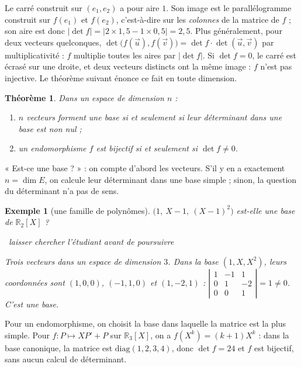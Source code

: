 \documentclass[a4paper,11pt]{article}
\numberwithin{equation}{section}
\numberwithin{figure}{section}
\numberwithin{table}{section}
\theoremstyle{enonce}
\newtheorem{theoreme}[definition]{Théorème}
\theoremstyle{exemple}
\newtheorem{exemple}[definition]{Exemple}
\theoremstyle{remarque}
\newcommand{\chercher}{\par\smallskip\noindent{\color{Filet}\rule[0.5ex]{1.2cm}{0.4pt}}\
  {\footnotesize\sffamily\itshape\color{Gris}laisser chercher l'étudiant avant de poursuivre}\par\smallskip}
\newcommand{\marge}[1]{\leavevmode\marginpar{\raggedleft\scriptsize\sffamily\color{Gris}\textls[100]{\MakeUppercase{#1}}}\ignorespaces}
\newcommand{\R}{\mathbb{R}}
\newcommand{\ve}[1]{\vec{#1}}
\newcommand{\dt}[1]{\left|\begin{matrix}#1\end{matrix}\right|}
\begin{document}
\begin{lecture}
Le carré construit sur $(e_1,e_2)$ a pour aire $1$. Son image est le parallélogramme construit sur $f(e_1)$ et $f(e_2)$,
c'est-à-dire sur les \emph{colonnes} de la matrice de $f$ ; son aire est donc $|\det f|=|2\times1{,}5-1\times0{,}5|=2{,}5$.
Plus généralement, pour deux vecteurs quelconques, $\det\big(f(\ve u),f(\ve v)\big)=\det f\cdot\det(\ve u,\ve v)$ par
multiplicativité : $f$ multiplie toutes les aires par $|\det f|$. Si $\det f=0$, le carré est écrasé sur une droite, et
deux vecteurs distincts ont la même image : $f$ n'est pas injective. Le théorème suivant énonce ce fait en toute dimension.
\end{lecture}

\begin{theoreme}\label{thm:base}
Dans un espace de dimension $n$ :
\begin{enumerate}
\item $n$ vecteurs forment une base si et seulement si leur déterminant dans une base est non nul ;
\item un endomorphisme $f$ est bijectif si et seulement si $\det f\neq0$.
\end{enumerate}
\end{theoreme}

\begin{reflexe}
« Est-ce une base ? » : on compte d'abord les vecteurs. S'il y en a exactement $n=\dim E$, on calcule leur déterminant
dans une base simple ; sinon, la question du déterminant n'a pas de sens.
\end{reflexe}

\marge{Ensemble}
\begin{exemple}[une famille de polynômes]
$\big(1,\ X-1,\ (X-1)^2\big)$ est-elle une base de $\R_2[X]$ ?
\chercher
Trois vecteurs dans un espace de dimension $3$. Dans la base $(1,X,X^2)$, leurs coordonnées sont $(1,0,0)$,
$(-1,1,0)$ et $(1,-2,1)$ :
$\dt{1&-1&1\\0&1&-2\\0&0&1}=1\neq0$. C'est une base.
\end{exemple}

\begin{astuce}
Pour un endomorphisme, on choisit la base dans laquelle la matrice est la plus simple. Pour $f:P\mapsto XP'+P$ sur
$\R_3[X]$, on a $f(X^k)=(k+1)X^k$ : dans la base canonique, la matrice est $\mathrm{diag}(1,2,3,4)$, donc $\det f=24$ et
$f$ est bijectif, sans aucun calcul de déterminant.
\end{astuce}
\end{document}
